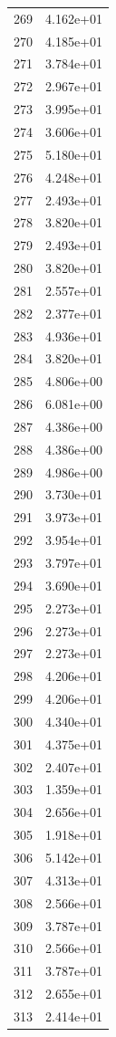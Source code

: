 \documentclass[12pt]{article}
\begin{document}
\begin{longtable}{@{}cc@{}}
269 & 4.162e+01 \\
270 & 4.185e+01 \\
271 & 3.784e+01 \\
272 & 2.967e+01 \\
273 & 3.995e+01 \\
274 & 3.606e+01 \\
275 & 5.180e+01 \\
276 & 4.248e+01 \\
277 & 2.493e+01 \\
278 & 3.820e+01 \\
279 & 2.493e+01 \\
280 & 3.820e+01 \\
281 & 2.557e+01 \\
282 & 2.377e+01 \\
283 & 4.936e+01 \\
284 & 3.820e+01 \\
285 & 4.806e+00 \\
286 & 6.081e+00 \\
287 & 4.386e+00 \\
288 & 4.386e+00 \\
289 & 4.986e+00 \\
290 & 3.730e+01 \\
291 & 3.973e+01 \\
292 & 3.954e+01 \\
293 & 3.797e+01 \\
294 & 3.690e+01 \\
295 & 2.273e+01 \\
296 & 2.273e+01 \\
297 & 2.273e+01 \\
298 & 4.206e+01 \\
299 & 4.206e+01 \\
300 & 4.340e+01 \\
301 & 4.375e+01 \\
302 & 2.407e+01 \\
303 & 1.359e+01 \\
304 & 2.656e+01 \\
305 & 1.918e+01 \\
306 & 5.142e+01 \\
307 & 4.313e+01 \\
308 & 2.566e+01 \\
309 & 3.787e+01 \\
310 & 2.566e+01 \\
311 & 3.787e+01 \\
312 & 2.655e+01 \\
313 & 2.414e+01 \\

\end{longtable}
\end{document}
